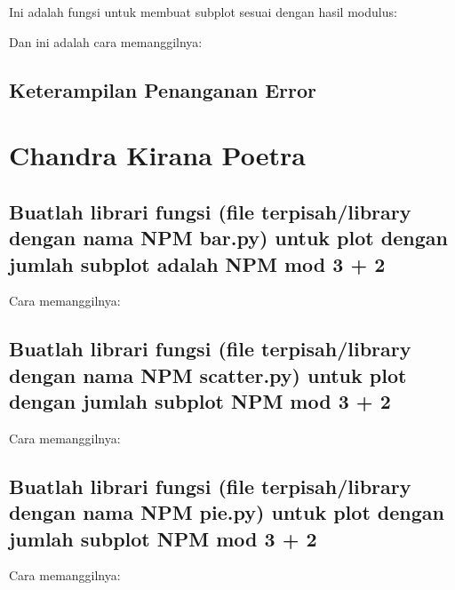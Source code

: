Ini adalah fungsi untuk membuat subplot sesuai dengan hasil modulus:


Dan ini adalah cara memanggilnya:



\subsection{Keterampilan Penanganan Error}


\section{Chandra Kirana Poetra}
\subsection{Buatlah librari fungsi (file terpisah/library dengan nama NPM bar.py) untuk plot dengan jumlah subplot adalah NPM mod 3 + 2}



Cara memanggilnya:


\subsection{Buatlah librari fungsi (file terpisah/library dengan nama NPM scatter.py) untuk plot dengan jumlah subplot NPM mod 3 + 2}



Cara memanggilnya:


\subsection{Buatlah librari fungsi (file terpisah/library dengan nama NPM pie.py) untuk plot dengan jumlah subplot NPM mod 3 + 2}



Cara memanggilnya:


